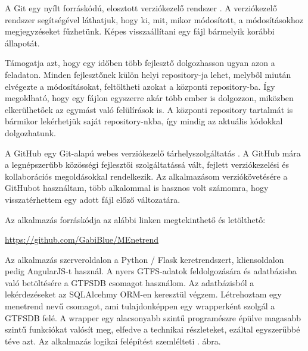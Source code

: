 
A Git egy nyílt forráskódú, elosztott verziókezelő rendszer \cite{git}. A verziókezelő rendszer segítségével láthatjuk, hogy ki, mit, mikor módosított, a módosításokhoz megjegyzéseket fűzhetünk. Képes visszaállítani egy fájl bármelyik korábbi állapotát.

Támogatja azt, hogy egy időben több fejlesztő dolgozhasson ugyan azon a feladaton. Minden fejlesztőnek külön helyi repository-ja lehet, melyből miután elvégezte a módosításokat, feltöltheti azokat a központi repository-ba. Így megoldható, hogy egy fájlon egyszerre akár több ember is dolgozzon, miközben elkerülhetőek az egymást való felülírások is. A központi repository tartalmát is bármikor lekérhetjük saját repository-nkba, így mindig az aktuális kódokkal dolgozhatunk.


A GitHub egy Git-alapú webes verziókezelő tárhelyszolgáltatás \cite{github}. A GitHub mára a legnépszerűbb közösségi fejlesztői szolgáltatássá vált, fejlett verziókezelési és kollaborációs megoldásokkal rendelkezik. Az alkalmazásom verziókövetésére a GitHubot használtam, több alkalommal is hasznos volt számomra, hogy visszatérhettem egy adott fájl előző változatára.

Az alkalmazás forráskódja az alábbi linken megtekinthető és letölthető:
\begin{center}
\url{https://github.com/GabiBlue/MEnetrend}
\end{center}


Az alkalmazás szerveroldalon a Python / Flask keretrendszert, kliensoldalon pedig An\-gu\-lar\-JS-t használ. A nyers GTFS-adatok feldolgozására és adatbázisba való betöltésére a GTFSDB csomagot használom. Az adatbázisból a lekérdezéseket az SQLAlcehmy ORM-en keresztül végzem. Létrehoztam egy menetrend nevű csomagot, ami tulajdonképpen egy wrapperként szolgál a GTFSDB felé. A wrapper egy alacsonyabb szintű programészre épülve magasabb szintű funkciókat valósít meg, elfedve a technikai részleteket, ezáltal egyszerűbbé téve azt. Az alkalmazás logikai felépítést szemlélteti . ábra.


